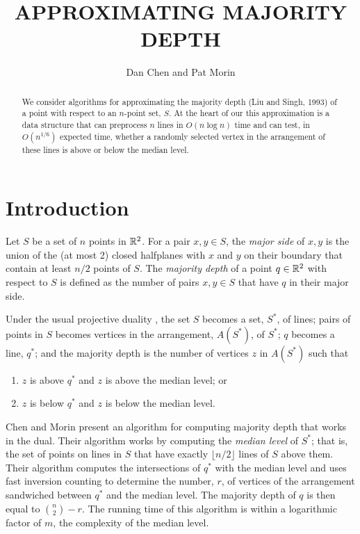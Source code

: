 \documentclass{patmorin}
\title{\MakeUppercase{Approximating Majority Depth}}
\author{Dan Chen and Pat Morin}
\begin{document}
\maketitle

\begin{abstract}
We consider algorithms for approximating the majority depth (Liu and
Singh, 1993) of a point with respect to an $n$-point set, $S$.  At the
heart of our this approximation is a data structure that can preprocess
$n$ lines in $O(n\log n)$ time and can test, in $O(n^{1/6})$ expected
time, whether a randomly selected vertex in the arrangement of these
lines is above or below the median level.
\end{abstract}

\section{Introduction}

Let $S$ be a set of $n$ points in $\mathbb{R}^2$.  For a pair $x,y\in S$,
the \emph{major side} of $x,y$ is the union of the (at most 2) closed
halfplanes with $x$ and $y$ on their boundary that contain at least
$n/2$ points of $S$.  The \emph{majority depth} \cite{ls93,s91} of a
point $q\in\mathbb{R}^2$ with respect to $S$ is defined as the number of pairs
$x,y\in S$ that have $q$ in their major side.

Under the usual projective duality \cite{e97}, the set $S$ becomes a
set, $S^*$, of lines; pairs of points in $S$ becomes vertices in the
arrangement, $A(S^*)$, of $S^*$; $q$ becomes a line, $q^*$; and the
majority depth is the number of vertices $z$ in $A(S^*)$ such that
\begin{enumerate}
\item $z$ is above $q^*$ and $z$ is above the median level; or
\item $z$ is below $q^*$ and $z$ is below the median level.
\end{enumerate}

Chen and Morin \cite{cm11} present an algorithm for computing majority
depth that works in the dual.  Their algorithm works by computing the
\emph{median level} of $S^*$; that is, the set of points on lines in
$S$ that have exactly $\lfloor n/2\rfloor$ lines of $S$ above them.
Their algorithm computes the intersections of $q^*$ with the median
level and uses fast inversion counting to determine the number, $r$,
of vertices of the arrangement sandwiched between $q^*$ and the median
level.  The majority depth of $q$ is then equal to $\binom{n}{2}-r$.
The running time of this algorithm is within a logarithmic factor of $m$,
the complexity of the median level.
\end{document}

